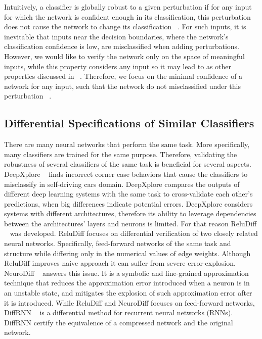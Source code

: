 Intuitively, a classifier is globally robust to a given perturbation if for any input for which the network is confident enough in its classification, this perturbation does not cause the network to change its classification ~\cite{GLOBALROBUSNN}. For such inputs, it is inevitable that inputs near the decision boundaries, where the network’s classification confidence is low, are misclassified when adding perturbations. However, we would like to verify the network only on the space of meaningful inputs, while this property considers any input so it may lead to as other properties discussed in ~\cite{Reluplex,EFCIENTGLOBALROBU}. Therefore, we focus on the minimal confidence of a network for any input, such that the network do not misclassified under this perturbation ~\cite{VHAGAR}.
     
\subsection{Differential Specifications of Similar Classifiers}
There are many neural networks that perform the same task. More specifically, many classifiers are trained for the same purpose. Therefore, validating the robustness of several classifiers of the same task is beneficial for several aspects. DeepXplore ~\cite{DEEPXPLORE} finds incorrect corner case behaviors that cause the classifiers to misclassify in self-driving cars domain. DeepXplore compares the outputs of different deep learning systems with the same task to cross-validate each other’s predictions, when big differences indicate potential errors. DeepXplore considers systems with different architectures, therefore its ability to leverage dependencies between the architectures' layers and neurons is limited. For that reason ReluDiff ~\cite{RELUDIFF} was developed. ReluDiff focuses on differential verification of two closely related neural networks. Specifically, feed-forward networks of the same task and structure while differing only in the numerical values of edge weights. Although ReluDiff improves naive approach it can suffer from severe error-explosion. NeuroDiff ~\cite{NEURODIFF} answers this issue. It is a symbolic and fine-grained approximation technique that reduces the approximation error introduced when a neuron is in an unstable state, and mitigates the explosion of such approximation error after it is introduced. While ReluDiff and NeuroDiff focuses on feed-forward networks, DiffRNN ~\cite{DIFFRNN} is a differential method for recurrent neural networks (RNNs). DiffRNN certify the equivalence of a compressed network and the original network.

